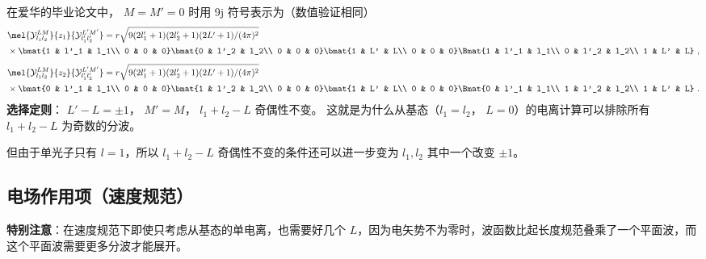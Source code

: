 在爱华的毕业论文中， $M = M' = 0$ 时用 9j 符号表示为（数值验证相同）
\begin{equation}
\begin{aligned}
&\mel{\mathcal{Y}_{l_1 l_2}^{LM}}{z_1}{\mathcal{Y}_{l_1' l_2'}^{L'M'}}=
r\sqrt{9(2l'_1+1)(2l'_2+1)(2L'+1)/(4\pi)^2}\\
&\times\bmat{1 & l'_1 & l_1\\ 0 & 0 & 0} \bmat{0 & l'_2 & l_2\\ 0 & 0 & 0} \bmat{1 & L' & L\\ 0 & 0 & 0}\Bmat{1 & l'_1 & l_1\\ 0 & l'_2 & l_2\\ 1 & L' & L}~,
\end{aligned}
\end{equation}
\begin{equation}
\begin{aligned}
&\mel{\mathcal{Y}_{l_1 l_2}^{LM}}{z_2}{\mathcal{Y}_{l_1' l_2'}^{L'M'}}=
r\sqrt{9(2l'_1+1)(2l'_2+1)(2L'+1)/(4\pi)^2}\\
&\times\bmat{0 & l'_1 & l_1\\ 0 & 0 & 0} \bmat{1 & l'_2 & l_2\\ 0 & 0 & 0} \bmat{1 & L' & L\\ 0 & 0 & 0}\Bmat{0 & l'_1 & l_1\\ 1 & l'_2 & l_2\\ 1 & L' & L}~.
\end{aligned}
\end{equation}
\textbf{选择定则}： $L' - L = \pm 1$， $M' = M$， $l_1+l_2-L$ 奇偶性不变。 %
这就是为什么从基态（$l_1=l_2$， $L=0$）的电离计算可以排除所有 $l_1+l_2-L$ 为奇数的分波。

但由于单光子只有 $l=1$，所以 $l_1+l_2-L$ 奇偶性不变的条件还可以进一步变为 $l_1,l_2$ 其中一个改变 $\pm 1$。

\subsection{电场作用项（速度规范）}
\textbf{特别注意}：在速度规范下即使只考虑从基态的单电离，也需要好几个 $L$，因为电矢势不为零时，波函数比起长度规范叠乘了一个平面波，而这个平面波需要更多分波才能展开。

